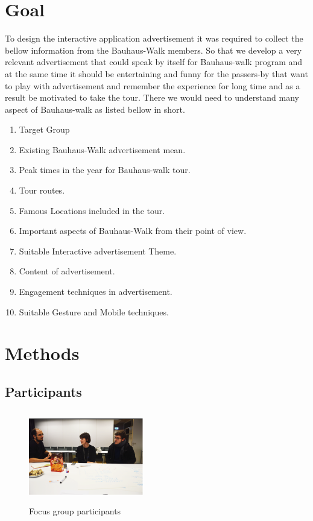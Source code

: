 \section{Goal}
To design the interactive application advertisement it was required to collect the bellow information from the Bauhaus-Walk members. So that we develop a very relevant advertisement that could speak by itself for Bauhaus-walk program and at the same time it should be entertaining and funny for the passers-by that want to play with advertisement and remember the experience for long time and as a result be motivated to take the tour. There we would need to understand many aspect of Bauhaus-walk as listed bellow in short.

\begin{enumerate}
\item Target Group
\item  Existing Bauhaus-Walk advertisement mean.
\item Peak times in the year for Bauhaus-walk tour.
\item Tour routes.
\item Famous Locations included in the tour.
\item Important aspects of Bauhaus-Walk from their point of view.
\item Suitable Interactive advertisement Theme. 
\item Content of advertisement.
\item Engagement techniques in advertisement.
\item Suitable Gesture and Mobile techniques.		
\end{enumerate}

\section{Methods}

\subsection{Participants}

\begin{figure} %
    \centering
\includegraphics[width=50mm,height=40mm]{Figures/4/focus_group}
\caption{Focus group participants}
\label{fig:Focus_group}
\end{figure} 

